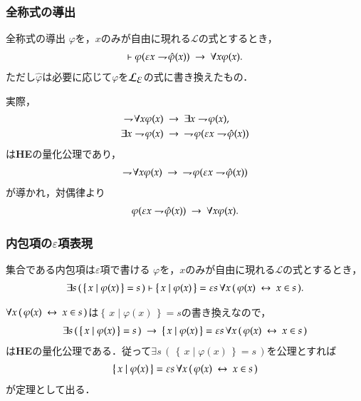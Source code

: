 \documentclass[dvipdfmx,10pt,notheorems]{beamer}
\theoremstyle{definition}
\newcommand{\lang}[1]{\mathcal{L}_{\scalebox{1.2}{$#1$}}} %
\newcommand{\Set}[2]{\left\{\, #1 \mid #2\, \right\}} %
\newcommand{\negation}{\rightharpoondown\hspace{-0.25em}} %
\newcommand{\rarrow}{\hspace{0.25em}\rightarrow\hspace{0.25em}} %
\newcommand{\lrarrow}{\hspace{0.25em}\leftrightarrow\hspace{0.25em}} %
\begin{document}
\begin{frame}\frametitle{全称式の導出}
	\begin{block}{全称式の導出}
		$\varphi$を，$x$のみが自由に現れる$\mathcal{L}$の式とするとき，
		\begin{align}
			\vdash \varphi(\varepsilon x \negation \hat{\varphi}(x)) \rarrow \forall x \varphi(x).
		\end{align}
		ただし$\hat{\varphi}$は必要に応じて$\varphi$を$\lang{\varepsilon}$の式に書き換えたもの．
	\end{block}
	実際，
	\begin{align}
		\negation \forall x \varphi(x) &\rarrow \exists x \negation \varphi(x), \\
		\exists x \negation \varphi(x) &\rarrow\ \negation \varphi(\varepsilon x \negation \hat{\varphi}(x))
	\end{align}
	は{\bf HE}の量化公理であり，
	\begin{align}
		\negation \forall x \varphi(x) \rarrow\ \negation \varphi(\varepsilon x \negation \hat{\varphi}(x))
	\end{align}
	が導かれ，対偶律より
	\begin{align}
		\varphi(\varepsilon x \negation \hat{\varphi}(x)) \rarrow \forall x \varphi(x).
	\end{align}
\end{frame}

\begin{frame}\frametitle{内包項の$\varepsilon$項表現}
	\begin{block}{集合である内包項は$\varepsilon$項で書ける}
		$\varphi$を，$x$のみが自由に現れる$\mathcal{L}$の式とするとき，
		\begin{align}
			\exists s\, (\, \Set{x}{\varphi(x)} = s\, )
			\vdash \Set{x}{\varphi(x)} = 
			\varepsilon s\, \forall x\, (\, \varphi(x) \lrarrow x \in s\, ).
		\end{align}
	\end{block}
	
	$\forall x\, (\, \varphi(x) \lrarrow x \in s\, )$は$\Set{x}{\varphi(x)} = s$の書き換えなので，
	\begin{align}
		\exists s\, (\, \Set{x}{\varphi(x)} = s\, ) \rarrow 
		\Set{x}{\varphi(x)} = \varepsilon s\, \forall x\, (\, \varphi(x) \lrarrow x \in s\, )
	\end{align}
	は{\bf HE}の量化公理である．従って$\exists s\, (\, \Set{x}{\varphi(x)} = s\, )$を公理とすれば
	\begin{align}
		\Set{x}{\varphi(x)} = \varepsilon s\, \forall x\, (\, \varphi(x) \lrarrow x \in s\, )
	\end{align}
	が定理として出る．
\end{frame}
\end{document}
